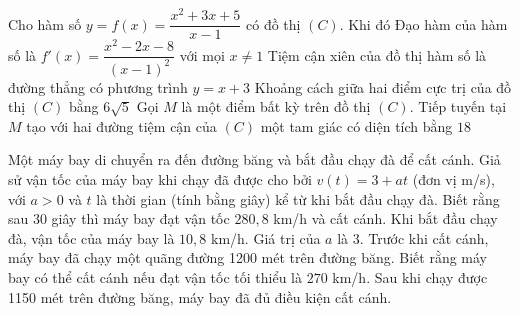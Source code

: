 \begin{ex}%
	Cho hàm số $y=f(x)=\dfrac{x^2+3x+5}{x-1}$ có đồ thị $(C)$. Khi đó
	\choiceTF
	{\True Đạo hàm của hàm số là $f'(x)=\dfrac{x^2-2x-8}{(x-1)^2}$ với mọi $x \neq 1$}
	{Tiệm cận xiên của đồ thị hàm số là đường thẳng có phương trình $y=x+3$}
	{\True Khoảng cách giữa hai điểm cực trị của đồ thị $(C)$ bằng $6\sqrt{5}$}
	{\True Gọi $M$ là một điểm bất kỳ trên đồ thị $(C)$. Tiếp tuyến tại $M$ tạo với hai đường tiệm cận của $(C)$ một tam giác có diện tích bằng $18$}
\end{ex}

\begin{ex}%
	Một máy bay di chuyển ra đến đường băng và bắt đầu chạy đà để cất cánh. Giả sử vận tốc của máy bay khi chạy đã được cho bởi $v(t)=3+at$ (đơn vị m/s), với $a>0$ và $t$ là thời gian (tính bằng giây) kể từ khi bắt đầu chạy đà. Biết rằng sau 30 giây thì máy bay đạt vận tốc $280{,}8$ km/h và cất cánh.
	\choiceTF
	{\True Khi bắt đầu chạy đà, vận tốc của máy bay là $10{,}8$ km/h.}
	{Giá trị của $a$ là 3.}
	{Trước khi cất cánh, máy bay đã chạy một quãng đường 1200 mét trên đường băng.}
	{\True Biết rằng máy bay có thể cất cánh nếu đạt vận tốc tối thiểu là $270$ km/h. Sau khi chạy được 1150 mét trên đường băng, máy bay đã đủ điều kiện cất cánh.}
\end{ex}


